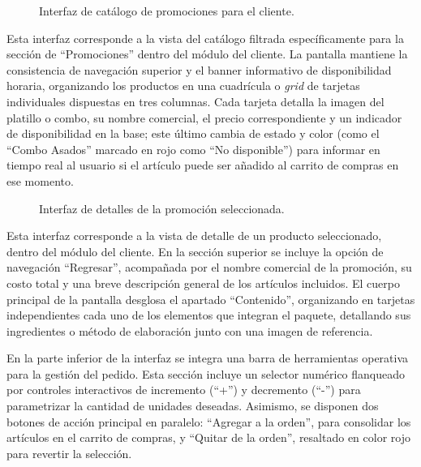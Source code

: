 \begin{figure}[H]
    \centering
    
    \caption{Interfaz de catálogo de promociones para el cliente.}
    \label{fig:ui-cli-04}
\end{figure}

Esta interfaz corresponde a la vista del catálogo filtrada específicamente para la sección de ``Promociones'' dentro del módulo del cliente. La pantalla mantiene la consistencia de navegación superior y el banner informativo de disponibilidad horaria, organizando los productos en una cuadrícula o \textit{grid} de tarjetas individuales dispuestas en tres columnas. Cada tarjeta detalla la imagen del platillo o combo, su nombre comercial, el precio correspondiente y un indicador de disponibilidad en la base; este último cambia de estado y color (como el ``Combo Asados'' marcado en rojo como ``No disponible'') para informar en tiempo real al usuario si el artículo puede ser añadido al carrito de compras en ese momento.

\begin{figure}[H]
    \centering
    
    \caption{Interfaz de detalles de la promoción seleccionada.}
    \label{fig:ui-cli-05}
\end{figure}

Esta interfaz corresponde a la vista de detalle de un producto seleccionado, dentro del módulo del cliente. En la sección superior se incluye la opción de navegación ``Regresar'', acompañada por el nombre comercial de la promoción, su costo total y una breve descripción general de los artículos incluidos. El cuerpo principal de la pantalla desglosa el apartado ``Contenido'', organizando en tarjetas independientes cada uno de los elementos que integran el paquete, detallando sus ingredientes o método de elaboración junto con una imagen de referencia.

En la parte inferior de la interfaz se integra una barra de herramientas operativa para la gestión del pedido. Esta sección incluye un selector numérico flanqueado por controles interactivos de incremento (``+'') y decremento (``-'') para parametrizar la cantidad de unidades deseadas. Asimismo, se disponen dos botones de acción principal en paralelo: ``Agregar a la orden'', para consolidar los artículos en el carrito de compras, y ``Quitar de la orden'', resaltado en color rojo para revertir la selección.

